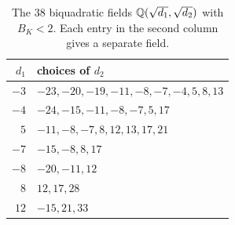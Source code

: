 \begin{table}[ht]\centering\small
\begin{tabular}{r|l}
$d_1$ & choices of $d_2$\\\hline
$-3$ & $-23,-20,-19,-11,-8,-7,-4,5,8,13$\\
$-4$ & $-24,-15,-11,-8,-7,5,17$\\
$5$ & $-11,-8,-7,8,12,13,17,21$\\
$-7$ & $-15,-8,8,17$\\
$-8$ & $-20,-11,12$\\
$8$ & $12,17,28$\\
$12$ & $-15,21,33$
\end{tabular}
\caption{The $38$ biquadratic fields $\mathbb{Q}(\sqrt{d_1},\sqrt{d_2})$ with $B_K<2$. Each entry
in the second column gives a separate field.}\label{zer:tab:biquadratic}
\end{table}

